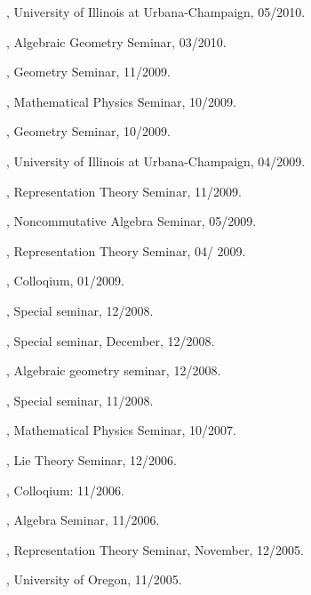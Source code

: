 \documentclass[11pt]{amsart}
\theoremstyle{plain}
\theoremstyle{definition}
\theoremstyle{remark}
\begin{document}
,
University of Illinois at Urbana-Champaign,
05/2010.

, Algebraic Geometry Seminar,
03/2010.

, Geometry Seminar, 11/2009.

, Mathematical Physics Seminar,
10/2009.

, Geometry Seminar, 10/2009.

, University of Illinois at Urbana-Champaign,
04/2009.


, Representation Theory Seminar, 11/2009.

, Noncommutative Algebra Seminar, 05/2009.

, Representation Theory Seminar, 04/ 2009.



, Colloqium, 01/2009.

, Special seminar, 12/2008.

, Special seminar, December, 12/2008.

, Algebraic geometry seminar, 12/2008.

, Special seminar, 11/2008.




, Mathematical
Physics Seminar, 10/2007.

, Lie Theory
Seminar, 12/2006.

, Colloqium:
11/2006.

, Algebra
Seminar, 11/2006.

,
Representation Theory Seminar, November, 12/2005.

, University of Oregon,
11/2005.
\end{document}
